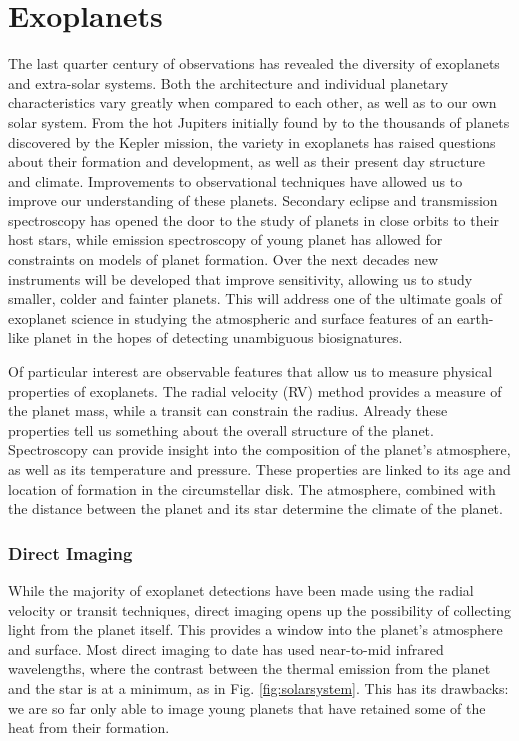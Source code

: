 \section{Exoplanets}
The last quarter century of observations has revealed the diversity of exoplanets and extra-solar systems.
Both the architecture and individual planetary characteristics vary greatly when compared to each other, as well as to our own solar system.
From the hot Jupiters initially found by \parencite{Mayor1995} to the thousands of planets discovered by the Kepler mission, the variety in exoplanets has raised questions about their formation and development, as well as their present day structure and climate.
Improvements to observational techniques have allowed us to improve our understanding of these planets.
Secondary eclipse and transmission spectroscopy has opened the door to the study of planets in close orbits to their host stars, while emission spectroscopy of young planet has allowed for constraints on models of planet formation.
Over the next decades new instruments will be developed that improve sensitivity, allowing us to study smaller, colder and fainter planets.
This will address one of the ultimate goals of exoplanet science in studying the atmospheric and surface features of an earth-like planet in the hopes of detecting unambiguous biosignatures.

Of particular interest are observable features that allow us to measure physical properties of exoplanets.
The radial velocity (RV) method provides a measure of the planet mass, while a transit can constrain the radius.
Already these properties tell us something about the overall structure of the planet.
Spectroscopy can provide insight into the composition of the planet's atmosphere, as well as its temperature and pressure.
These properties are linked to its age and location of formation in the circumstellar disk.
The atmosphere, combined with the distance between the planet and its star determine the climate of the planet.

\subsubsection{Direct Imaging}
While the majority of exoplanet detections have been made using the radial velocity or transit techniques, direct imaging opens up the possibility of collecting light from the planet itself.
This provides a window into the planet's atmosphere and surface.
Most direct imaging to date has used near-to-mid infrared wavelengths, where the contrast between the thermal emission from the planet and the star is at a minimum, as in Fig. \ref{fig:solarsystem}.
This has its drawbacks: we are so far only able to image young planets that have retained some of the heat from their formation.
 
